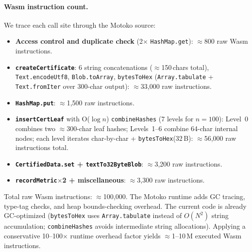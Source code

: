 \documentclass[journal]{IEEEtran}
\begin{document}
\paragraph{Wasm instruction count.}
We trace each call site through the Motoko source:
\begin{itemize}[leftmargin=*]
  \item \textbf{Access control and duplicate check} (2$\times$ \texttt{HashMap.get}): $\approx$800 raw Wasm instructions.
  \item \textbf{\texttt{createCertificate}}: 6 string concatenations ($\approx$150\,chars total), \texttt{Text.encodeUtf8}, \texttt{Blob.toArray}, \texttt{bytesToHex} (\texttt{Array.tabulate} + \texttt{Text.fromIter} over 300-char output): $\approx$33{,}000 raw instructions.
  \item \textbf{\texttt{HashMap.put}}: $\approx$1{,}500 raw instructions.
  \item \textbf{\texttt{insertCertLeaf}} with O($\log n$) \texttt{combineHashes} (7 levels for $n{=}100$): Level~0 combines two $\approx$300-char leaf hashes; Levels~1--6 combine 64-char internal nodes; each level iterates char-by-char + \texttt{bytesToHex}(32\,B): $\approx$56{,}000 raw instructions total.
  \item \textbf{\texttt{CertifiedData.set} + \texttt{textTo32ByteBlob}}: $\approx$3{,}200 raw instructions.
  \item \textbf{\texttt{recordMetric}$\times$2 + miscellaneous}: $\approx$3{,}300 raw instructions.
\end{itemize}

Total raw Wasm instructions: $\approx$100{,}000. The Motoko runtime adds GC tracing, type-tag checks, and heap bounds-checking overhead. The current code is already GC-optimized (\texttt{bytesToHex} uses \texttt{Array.tabulate} instead of $O(N^2)$ string accumulation; \texttt{combineHashes} avoids intermediate string allocations). Applying a conservative 10--100$\times$ runtime overhead factor yields $\approx$1--10\,M executed Wasm instructions.
\end{document}

